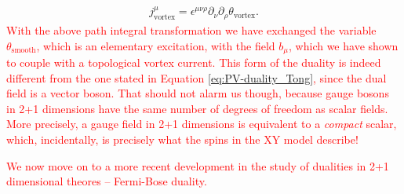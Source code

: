 \begin{align}
    j^{\mu}_{\text{vortex}} = \epsilon^{\mu \nu \rho} \partial_{\nu} \partial_{\rho} \theta_{\text{vortex}}.
\end{align}
 \textcolor{red}{With the above path integral transformation we have exchanged the variable $\theta_{\text{smooth}}$, which is an elementary excitation, with the field $b_{\mu}$, which we have shown to couple with a topological vortex current. This form of the duality is indeed different from the one stated in Equation \eqref{eq:PV-duality_Tong}, since the dual field is a vector boson. That should not alarm us though, because gauge bosons in 2+1 dimensions have the same number of degrees of freedom as scalar fields. More precisely, a gauge field in 2+1 dimensions is equivalent to a \textit{compact} scalar, which, incidentally, is precisely what the spins in the XY model describe!}

 \textcolor{red}{We now move on to a more recent development in the study of dualities in 2+1 dimensional theores -- Fermi-Bose duality.}
%

